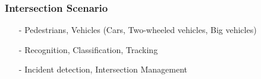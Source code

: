 \documentclass[table]{beamer}
\begin{document}
\frame
{
	\frametitle{Intersection Scenario}
	\begin{itemize}
		\item[-] Pedestrians, Vehicles (Cars, Two-wheeled vehicles, Big vehicles)
		\item[-] Recognition, Classification, Tracking
		\item[-] Incident detection, Intersection Management
	\end{itemize}
}
%
\end{document}
